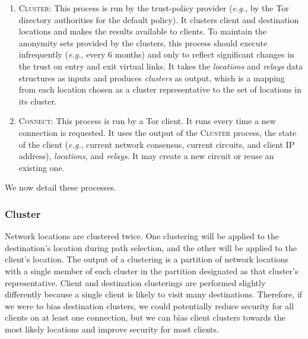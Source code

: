 \documentclass[conference]{styles/IEEEtran}
\newcommand{\eg}{\emph{e.g.}}
\newcommand{\compactify}{\settowidth{\labelsep}{o} \settowidth{\labelwidth}{o} \settowidth{\labelindent}{o}}
\begin{document}
\begin{enumerate}[\compactify]
\item \textsc{Cluster}: This process is run by the trust-policy provider (\eg{}, by the Tor
  directory authorities for the default policy). It clusters client and destination
  locations and makes the results available to clients. To maintain the anonymity sets provided by
  the clusters, this process should execute infrequently (\eg{}, every 6 months) and only to reflect
  significant changes in the trust on entry and exit virtual links. It takes the \textit{locations}
  and \textit{relays} data structures as inputs and produces \textit{clusters} as output, which is a
  mapping from each location chosen as a cluster representative to the set of locations in its
  cluster.
  
\item \textsc{Connect}: This process is run by a Tor client. It runs every time a new connection
  is requested. It uses the output of the \textsc{Cluster} process, the state of the client (\eg{},
  current network consensus, current circuits, and client IP address), \textit{locations}, and
  \textit{relays}. It may create a new circuit or reuse an existing one.
\end{enumerate}
We now detail these processes.

  
\subsubsection{Cluster}
Network locations are clustered twice. One clustering will be applied to the destination's location
during path selection, and the other will be applied to the client's location.
The output of a clustering is a partition of network locations with a single member of each cluster
in the partition designated as that cluster's representative. Client and destination clusterings are
performed slightly differently because a single client is likely to visit many destinations.
Therefore, if we were to bias destination clusters, we could potentially reduce security for all
clients on at least one connection, but we can bias client clusters towards the most likely
locations and improve security for most clients.
\end{document}
